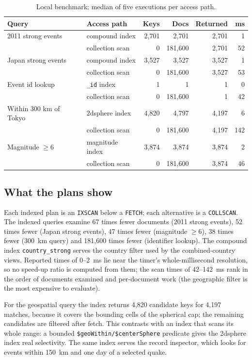 \documentclass[11pt,a4paper]{article}
\begin{document}
\begin{table}[H]\centering\small
\caption{Local benchmark: median of five executions per access path.}
\begin{tabular}{llrrrr}\toprule
Query & Access path & Keys & Docs & Returned & ms\\\midrule
2011 strong events & compound index & 2,701 & 2,701 & 2,701 & 1\\
 & collection scan & 0 & 181,600 & 2,701 & 52\\
Japan strong events & compound index & 3,527 & 3,527 & 3,527 & 1\\
 & collection scan & 0 & 181,600 & 3,527 & 53\\
Event id lookup & \texttt{\_id} index & 1 & 1 & 1 & 0\\
 & collection scan & 0 & 181,600 & 1 & 42\\
Within 300 km of Tokyo & 2dsphere index & 4,820 & 4,797 & 4,197 & 6\\
 & collection scan & 0 & 181,600 & 4,197 & 142\\
Magnitude $\ge6$ & magnitude index & 3,874 & 3,874 & 3,874 & 2\\
 & collection scan & 0 & 181,600 & 3,874 & 46\\
\bottomrule
\end{tabular}
\end{table}

\subsection{What the plans show}
Each indexed plan is an \texttt{IXSCAN} below a \texttt{FETCH}; each alternative is a \texttt{COLLSCAN}. The indexed queries examine 67 times fewer documents (2011 strong events), 52 times fewer (Japan strong events), 47 times fewer (magnitude $\ge6$), 38 times fewer (300~km query) and 181,600 times fewer (identifier lookup). The compound index \texttt{country\_strong} serves the country filter used by the combined-country views. Reported times of 0--2~ms lie near the timer's whole-millisecond resolution, so no speed-up ratio is computed from them; the scan times of 42--142~ms rank in the order of documents examined and per-document work (the geographic filter is the most expensive to evaluate).

For the geospatial query the index returns 4,820 candidate keys for 4,197 matches, because it covers the bounding cells of the spherical cap; the remaining candidates are filtered after fetch. This contrasts with an index that scans its whole range: a bounded \texttt{\$geoWithin/\$centerSphere} predicate gives the 2dsphere index real selectivity.\cite{mongo2dsphere} The same index serves the record inspector, which looks for events within 150~km and one day of a selected quake.
\end{document}
